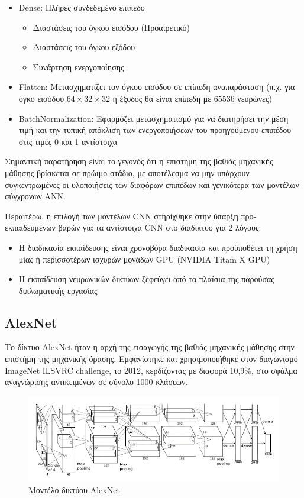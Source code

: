 \begin{itemize}
  \item{Dense: Πλήρες συνδεδεμένο επίπεδο}
    \begin{itemize}
      \item{Διαστάσεις του όγκου εισόδου (Προαιρετικό)}
      \item{Διαστάσεις του όγκου εξόδου}
      \item{Συνάρτηση ενεργοποίησης}
    \end{itemize}
  \item{Flatten: Μετασχηματίζει τον όγκου εισόδου σε επίπεδη αναπαράσταση
    (π.χ. για όγκο εισόδου $64 \times 32 \times 32$ η έξοδος θα είναι επίπεδη με $65536$ νευρώνες)}
  \item{BatchNormalization: Εφαρμόζει μετασχηματισμό για να διατηρήσει την μέση τιμή
      και την τυπική απόκλιση των ενεργοποιήσεων του προηγούμενου επιπέδου στις τιμές 0 και 1 αντίστοιχα}
\end{itemize}

Σημαντική παρατήρηση είναι το γεγονός ότι η επιστήμη της βαθιάς μηχανικής μάθησης
βρίσκεται σε πρώιμο στάδιο, με αποτέλεσμα να μην υπάρχουν συγκεντρωμένες
οι υλοποιήσεις των διαφόρων επιπέδων και γενικότερα των μοντέλων σύγχρονων ΑNN.

Περαιτέρω, η επιλογή των μοντέλων CNN στηρίχθηκε στην ύπαρξη
προ-εκπαιδευμένων βαρών για τα αντίστοιχα CNN στο διαδίκτυο για 2 λόγους:
\begin{itemize}
  \item{Η διαδικασία εκπαίδευσης είναι χρονοβόρα διαδικασία και προϋποθέτει
    τη χρήση μίας ή περισσοτέρων ισχυρών μονάδων GPU (NVIDIA Titam X GPU)}
  \item{Η εκπαίδευση νευρωνικών δικτύων ξεφεύγει από τα πλαίσια της παρούσας
    διπλωματικής εργασίας}
\end{itemize}


\subsection{AlexNet}

Το δίκτυο AlexNet ήταν η αρχή της εισαγωγής της βαθιάς
μηχανικής μάθησης στην επιστήμη της μηχανικής όρασης. Εμφανίστηκε και χρησιμοποιήθηκε
στον διαγωνισμό ImageNet ILSVRC challenge, το 2012, κερδίζοντας με διαφορά
10,9\%, στο σφάλμα αναγνώρισης αντικειμένων σε σύνολο 1000 κλάσεων.

\begin{figure}[!ht]
  \centering
  \includegraphics[width=1\textwidth]{./images/chapter5/alexnet_from_paper.png}
  \caption[Μοντέλο δικτύου AlexNet]{%
    Μοντέλο δικτύου AlexNet \cite{NIPS2012_4824}
  }
  \label{fig:alexnet_from_paper}
\end{figure}

